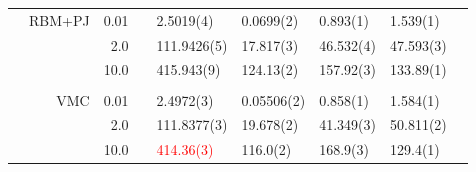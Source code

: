 \begin{table}
\begin{tabularx}{\textwidth}{R{0.5cm}rrcR{2.3cm}R{2.3cm}R{2.3cm}R{2.3cm}R{0.3cm}}
		&RBM+PJ & 0.01 && 2.5019(4) & 0.0699(2) & 0.893(1) & 1.539(1) \\
		&& 2.0 && 111.9426(5) & 17.817(3) & 46.532(4) & 47.593(3) \\
		&& 10.0 && 415.943(9) & 124.13(2) & 157.92(3) & 133.89(1) \\ \hdashline \\
		
		&VMC & 0.01 && 2.4972(3) & 0.05506(2) & 0.858(1) & 1.584(1)\\
		&& 2.0 && 111.8377(3) & 19.678(2) & 41.349(3) & 50.811(2) \\
		&& 10.0 && \textcolor{red}{414.36(3)} & 116.0(2) & 168.9(3) & 129.4(1) \\
		\hline\hline
	\end{tabularx}
\end{table}
\fi

